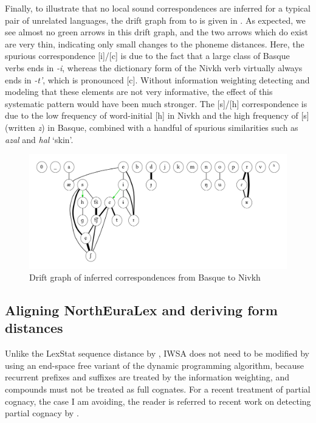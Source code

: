 Finally, to illustrate that no local sound correspondences are inferred for a typical pair of unrelated languages, the drift graph from  to  is given in . As expected, we see almost no green arrows in this drift graph, and the two arrows which do exist are very thin, indicating only small changes to the phoneme distances. Here, the spurious correspondence [i]/[c] is due to the fact that a large class of Basque verbs ends in \textit{-i}, whereas the dictionary form of the Nivkh verb virtually always ends in \textit{-t'}, which is pronounced [c]. Without information weighting detecting and modeling that these elements are not very informative, the effect of this systematic pattern would have been much stronger. The [s]/[h] correspondence is due to the low frequency of word-initial [h] in Nivkh and the high frequency of [s] (written \textit{z}) in Basque, combined with a handful of spurious similarities such as \textit{azal} and \textit{hal} `skin'.

\begin{figure}
\includegraphics[width=\textwidth]{figures/drift-graph-eu-niv.pdf}
\caption{Drift graph of inferred correspondences from Basque to Nivkh}
\label{fig:driftGraphEuNiv}
\end{figure}

\subsection{Aligning NorthEuraLex and deriving form distances}

Unlike the LexStat sequence distance by \cite{list2012}, IWSA does not need to be modified by using an end-space free variant of the dynamic programming algorithm, because recurrent prefixes and suffixes are treated by the information weighting, and compounds must not be treated as full cognates. For a recent treatment of partial cognacy, the case I am avoiding, the reader is referred to recent work on detecting partial cognacy by \cite{list_ea_2016}.

